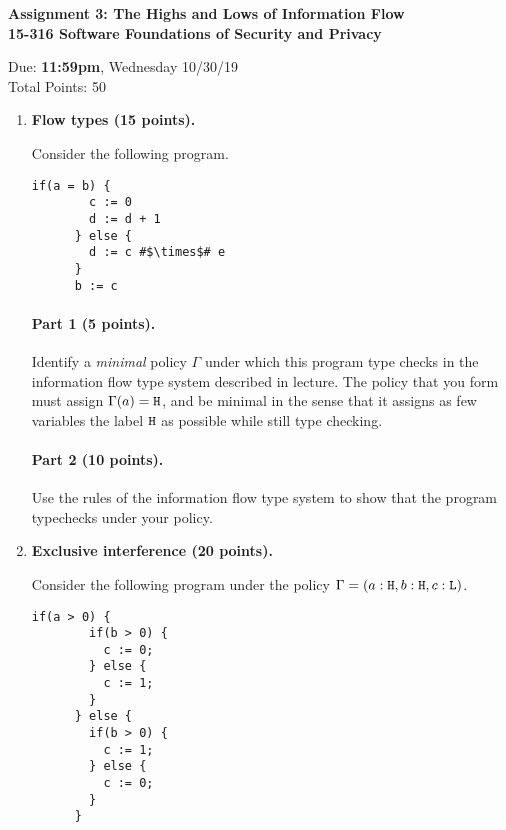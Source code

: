\documentclass[10pt]{article}
\begin{document}
\begin{center}
\textbf{ Assignment 3: The Highs and Lows of Information Flow\\15-316 Software Foundations of Security and Privacy}\\
\end{center}
Due: \textbf{ 11:59pm}, Wednesday 10/30/19 \\
Total Points: 50

\vspace{-5mm}

\begin{enumerate}
\item \textbf{Flow types (15 points).} 

Consider the following program.
\begin{lstlisting}[escapechar=\#]
      if(a = b) {
        c := 0
        d := d + 1
      } else {
        d := c #$\times$# e
      }
      b := c
\end{lstlisting}
\paragraph{Part 1 (5 points).}
Identify a \emph{minimal} policy $\Gamma$ under which this program type checks in the information flow type system described in lecture.
The policy that you form must assign $\Gamma(a) = \texttt{\upshape H}$, and be minimal in the sense that it assigns as few variables the label $\texttt{\upshape H}$ as possible while still type checking.

\paragraph{Part 2 (10 points).}
Use the rules of the information flow type system to show that the program typechecks under your policy.



\item \textbf{Exclusive interference (20 points).}

Consider the following program under the policy $\Gamma = (a : \texttt{\upshape H}, b : \texttt{\upshape H}, c : \texttt{\upshape L})$.

\begin{lstlisting}[escapechar=\#]
      if(a > 0) {
        if(b > 0) {
          c := 0;
        } else {
          c := 1;
        }
      } else {
        if(b > 0) {
          c := 1;
        } else {
          c := 0;
        }
      }
\end{lstlisting}


\end{enumerate}
\end{document}
